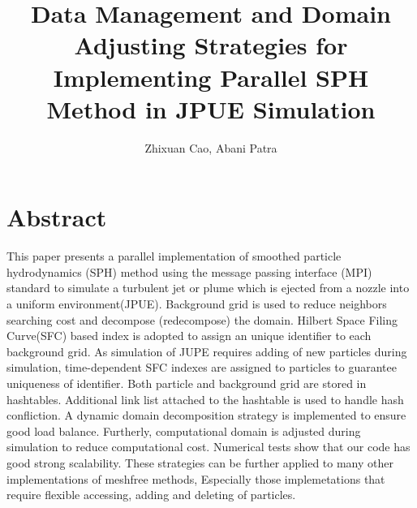 \documentclass[10pt,a4paper]{article}
\author{Zhixuan Cao, Abani Patra}
\title{Data Management and Domain Adjusting Strategies for Implementing Parallel SPH Method in JPUE Simulation}
\begin{document}
\maketitle
\section{Abstract}
This paper presents a parallel implementation of smoothed particle hydrodynamics (SPH) method using the message passing interface (MPI) standard to simulate a turbulent jet or plume which is ejected from a nozzle into a uniform environment(JPUE). Background grid is used to reduce neighbors searching cost and decompose (redecompose) the domain. Hilbert Space Filing Curve(SFC) based index is adopted to assign an unique identifier to each background grid. As simulation of JUPE requires adding of new particles during simulation, time-dependent SFC indexes are assigned to particles to guarantee uniqueness of identifier.  
Both particle and background grid are stored in hashtables. Additional link list attached to the hashtable is used to handle hash confliction. A dynamic domain decomposition strategy is implemented to ensure good load balance. Furtherly, computational domain is adjusted during simulation to reduce computational cost. 
Numerical tests show that our code has good strong scalability.
These strategies can be further applied to many other implementations of meshfree methods, Especially those implemetations that require flexible accessing, adding and deleting of particles.
\end{document}
